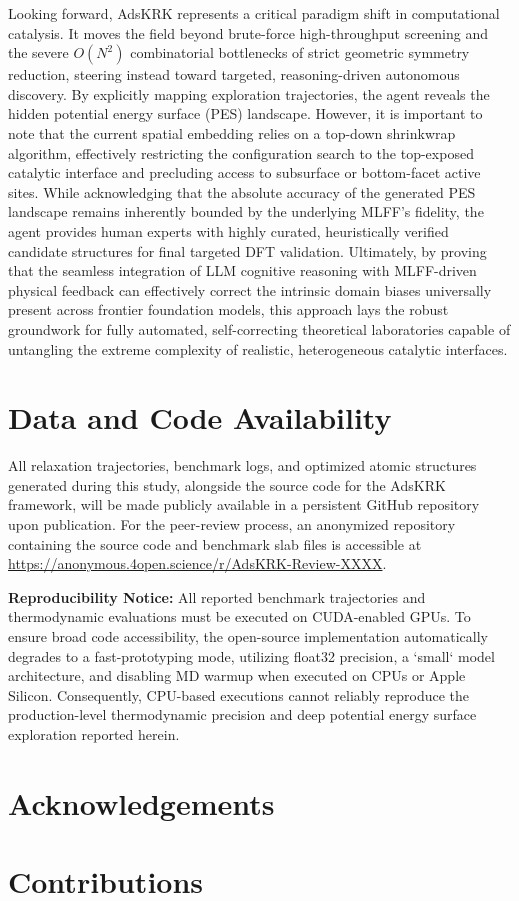 \documentclass{article}
\begin{document}
Looking forward, AdsKRK represents a critical paradigm shift in computational catalysis. It moves the field beyond brute-force high-throughput screening and the severe $O(N^2)$ combinatorial bottlenecks of strict geometric symmetry reduction, steering instead toward targeted, reasoning-driven autonomous discovery. By explicitly mapping exploration trajectories, the agent reveals the hidden potential energy surface (PES) landscape. However, it is important to note that the current spatial embedding relies on a top-down shrinkwrap algorithm, effectively restricting the configuration search to the top-exposed catalytic interface and precluding access to subsurface or bottom-facet active sites. While acknowledging that the absolute accuracy of the generated PES landscape remains inherently bounded by the underlying MLFF's fidelity, the agent provides human experts with highly curated, heuristically verified candidate structures for final targeted DFT validation. Ultimately, by proving that the seamless integration of LLM cognitive reasoning with MLFF-driven physical feedback can effectively correct the intrinsic domain biases universally present across frontier foundation models, this approach lays the robust groundwork for fully automated, self-correcting theoretical laboratories capable of untangling the extreme complexity of realistic, heterogeneous catalytic interfaces.

\section*{Data and Code Availability}
All relaxation trajectories, benchmark logs, and optimized atomic structures generated during this study, alongside the source code for the AdsKRK framework, will be made publicly available in a persistent GitHub repository upon publication. For the peer-review process, an anonymized repository containing the source code and benchmark slab files is accessible at \url{https://anonymous.4open.science/r/AdsKRK-Review-XXXX}.

\textbf{Reproducibility Notice:} All reported benchmark trajectories and thermodynamic evaluations must be executed on CUDA-enabled GPUs. To ensure broad code accessibility, the open-source implementation automatically degrades to a fast-prototyping mode, utilizing float32 precision, a `small` model architecture, and disabling MD warmup when executed on CPUs or Apple Silicon. Consequently, CPU-based executions cannot reliably reproduce the production-level thermodynamic precision and deep potential energy surface exploration reported herein.

\section*{Acknowledgements}

\section*{Contributions}

{\sloppy


}
\end{document}
